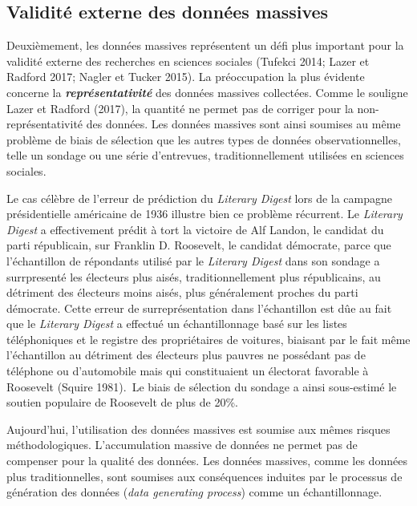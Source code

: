 \documentclass[
  letterpaper,
]{scrbook}
\begin{document}
\hypertarget{validituxe9-externe-des-donnuxe9es-massives}{%
\subsection{Validité externe des données
massives}\label{validituxe9-externe-des-donnuxe9es-massives}}

Deuxièmement, les données massives représentent un défi plus important
pour la validité externe des recherches en sciences sociales (Tufekci
2014; Lazer et Radford 2017; Nagler et Tucker 2015). La préoccupation la
plus évidente concerne la \textbf{\emph{représentativité}} des données
massives collectées. Comme le souligne Lazer et Radford (2017), la
quantité ne permet pas de corriger pour la non-représentativité des
données. Les données massives sont ainsi soumises au même problème de
biais de sélection que les autres types de données observationnelles,
telle un sondage ou une série d'entrevues, traditionnellement utilisées
en sciences sociales.

Le cas célèbre de l'erreur de prédiction du \emph{Literary Digest} lors
de la campagne présidentielle américaine de 1936 illustre bien ce
problème récurrent. Le \emph{Literary Digest} a effectivement prédit à
tort la victoire de Alf Landon, le candidat du parti républicain, sur
Franklin D. Roosevelt, le candidat démocrate, parce que l'échantillon de
répondants utilisé par le \emph{Literary Digest} dans son sondage a
surrpresenté les électeurs plus aisés, traditionnellement plus
républicains, au détriment des électeurs moins aisés, plus généralement
proches du parti démocrate. Cette erreur de surreprésentation dans
l'échantillon est dûe au fait que le \emph{Literary Digest} a effectué
un échantillonnage basé sur les listes téléphoniques et le registre des
propriétaires de voitures, biaisant par le fait même l'échantillon au
détriment des électeurs plus pauvres ne possédant pas de téléphone ou
d'automobile mais qui constituaient un électorat favorable à Roosevelt
(Squire 1981).~Le biais de sélection du sondage a ainsi sous-estimé le
soutien populaire de Roosevelt de plus de 20\%.

Aujourd'hui, l'utilisation des données massives est soumise aux mêmes
risques méthodologiques. L'accumulation massive de données ne permet pas
de compenser pour la qualité des données. Les données massives, comme
les données plus traditionnelles, sont soumises aux conséquences
induites par le processus de génération des données (\emph{data
generating process}) comme un échantillonnage.
\end{document}

